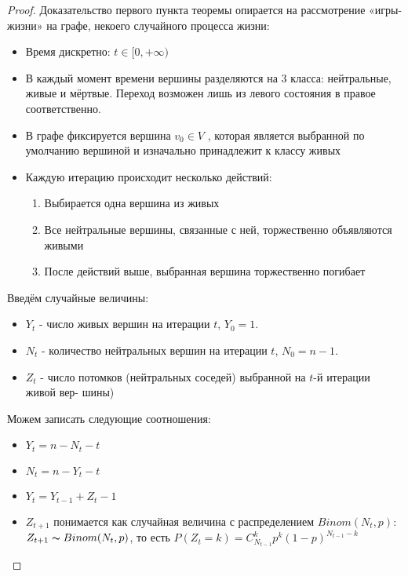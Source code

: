 \begin{proof}
Доказательство первого пункта теоремы опирается на рассмотрение «игры-жизни» на графе, некоего случайного процесса жизни:

\begin{itemize}
    \item  Время дискретно: $t \in [0, +\infty)$
    \item В каждый момент времени вершины разделяются на $3$ класса: нейтральные, живые и мёртвые. Переход возможен лишь из левого состояния в правое соответственно.
    \item В графе фиксируется вершина $v_0 \in V$ , которая является выбранной по умолчанию вершиной и изначально принадлежит к классу живых
    \item Каждую итерацию происходит несколько действий:
    \begin{enumerate}
        \item Выбирается одна вершина из живых
        \item Все нейтральные вершины, связанные с ней, торжественно объявляются живыми
        \item После действий выше, выбранная вершина торжественно погибает
    \end{enumerate}

\end{itemize}

Введём случайные величины:
    \begin{itemize}
        \item $Y_t$ - число живых вершин на итерации $t$, $Y_0 = 1$.
        \item $N_t$ - количество нейтральных вершин на итерации $t$, $N_0 = n -1$.
        \item $Z_t$ -  число потомков (нейтральных соседей) выбранной на $t$-й итерации живой вер- шины)
    \end{itemize}
Можем записать следующие соотношения:

\begin{itemize}
    \item $Y_t = n - N_t-t$
    \item $N_t = n - Y_t - t$
    \item $Y_t = Y_{t-1}+Z_t-1$
    \item $Z_{t+1}$ понимается как случайная величина с распределением $Binom(N_t, p)$:\\
    $Z_{t+1} \thicksim Binom(N_t,p)$, то есть $P(Z_t = k) = C_{N_{t-1}}^k p^k (1-p)^{N_{t-1} - k}$
\end{itemize}


\end{proof}
